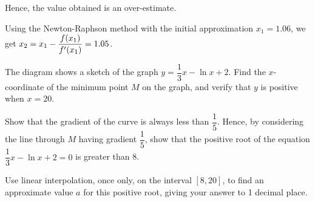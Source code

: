 \documentclass{echw}
\begin{document}
        Hence, the value obtained is an over-estimate.

        Using the Newton-Raphson method with the initial approximation $x_1 = 1.06$, we get $x_2 = x_1 - \dfrac{f(x_1)}{f^\prime(x_1)} = 1.05$.


    \problem{}
        \begin{center}
        \end{center}

        The diagram shows a sketch of the graph $y = \dfrac13 x - \ln{x+2}$. Find the $x$-coordinate of the minimum point $M$ on the graph, and verify that $y$ is positive when $x = 20$.

        Show that the gradient of the curve is always less than $\dfrac15$. Hence, by considering the line through $M$ having gradient $\dfrac15$, show that the positive root of the equation $\dfrac13 x - \ln{x+2} = 0$ is greater than 8.

        Use linear interpolation, once only, on the interval $[8, 20]$, to find an approximate value $a$ for this positive root, giving your answer to 1 decimal place.
\end{document}
